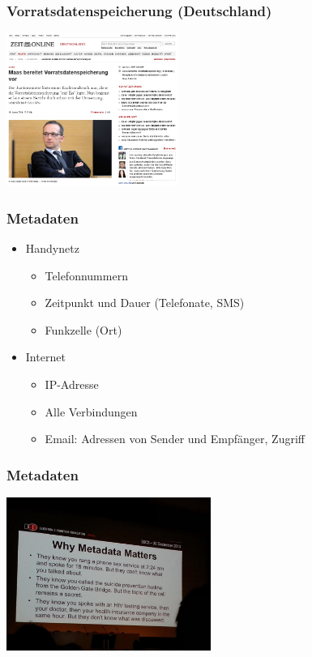 \documentclass[12pt]{beamer}
\begin{document}
\begin{frame}
  \frametitle{Vorratsdatenspeicherung (Deutschland)}
    \begin{center}
      \includegraphics[height=5cm]{img/zeit-vds.png}
    \end{center}
\end{frame}

\begin{frame}
  \frametitle{Metadaten}
  \begin{itemize}
    \item<2-> Handynetz
      \begin{itemize}
        \item<3-> Telefonnummern
        \item<4-> Zeitpunkt und Dauer (Telefonate, SMS)
        \item<5-> Funkzelle (Ort)
      \end{itemize}
    \item<6->Internet
      \begin{itemize}
        \item<7-> IP-Adresse
        \item<8-> Alle Verbindungen
        \item<9-> Email: Adressen von Sender und Empfänger, Zugriff
      \end{itemize}
  \end{itemize}
\end{frame}

\begin{frame}
  \frametitle{Metadaten}
    \begin{center}
      \includegraphics[height=5cm]{img/metadata-matters.jpg}
    \end{center}
\end{frame}
\end{document}
